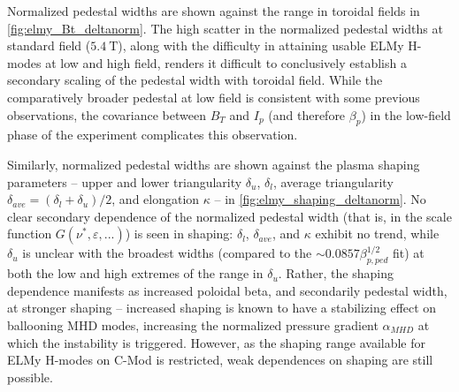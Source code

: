 Normalized pedestal widths are shown against the range in toroidal fields in \cref{fig:elmy_Bt_deltanorm}.  The high scatter in the normalized pedestal widths at standard field ($\SI{5.4}{\tesla}$), along with the difficulty in attaining usable ELMy H-modes at low and high field, renders it difficult to conclusively establish a secondary scaling of the pedestal width with toroidal field.  While the comparatively broader pedestal at low field is consistent with some previous observations, the covariance between $B_T$ and $I_p$ (and therefore $\beta_p$) in the low-field phase of the experiment complicates this observation.

\begin{figure}
 \pushtooutside
\end{figure}

Similarly, normalized pedestal widths are shown against the plasma shaping parameters -- upper and lower triangularity $\delta_u$, $\delta_l$, average triangularity $\delta_{ave} = (\delta_l + \delta_u)/2$, and elongation $\kappa$ -- in \cref{fig:elmy_shaping_deltanorm}.  No clear secondary dependence of the normalized pedestal width (that is, in the scale function $G(\nu^*,\varepsilon,...)$) is seen in shaping: $\delta_l$, $\delta_{ave}$, and $\kappa$ exhibit no trend, while $\delta_u$ is unclear with the broadest widths (compared to the $\sim 0.0857 \beta_{p,ped}^{1/2}$ fit) at both the low and high extremes of the range in $\delta_u$.  Rather, the shaping dependence manifests as increased poloidal beta, and secondarily pedestal width, at stronger shaping -- increased shaping is known to have a stabilizing effect on ballooning MHD modes, increasing the normalized pressure gradient $\alpha_{MHD}$ at which the instability is triggered.  However, as the shaping range available for ELMy H-modes on C-Mod is restricted, weak dependences on shaping are still possible.

